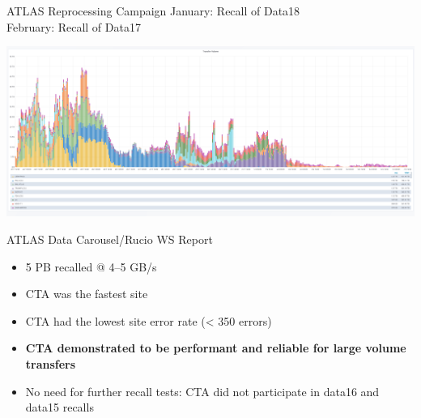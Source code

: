 \documentclass[aspectratio=1610]{beamer}
\begin{document}
\begin{frame}{ATLAS Reprocessing Campaign}{}
   \centering
   \vspace{1ex}
   {\LARGE\color{cern@blue}January: Recall of Data18\\
   February: Recall of Data17}

\begin{adjustwidth}{-1cm}{-1cm}
   \includegraphics[width=\linewidth]{images/RecallTest}
\end{adjustwidth}
\end{frame}

\begin{frame}{ATLAS Data Carousel/Rucio WS Report}{}
   \begin{itemize}
      \item 5 PB recalled @ 4--5 GB/s %
      \item CTA was the fastest site
      \item CTA had the lowest site error rate (< 350 errors)
      \item \textbf{CTA demonstrated to be performant and reliable for large volume transfers}
      \item No need for further recall tests: CTA did not participate in data16 and data15 recalls
   \end{itemize}
\end{frame}
\end{document}
